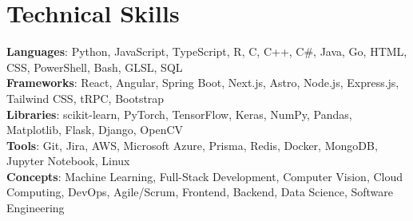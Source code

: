 \documentclass[letterpaper,11pt]{article}
\begin{document}
\section{Technical Skills}
 \begin{itemize}[leftmargin=0.15in, label={}]
    \small{\item{
     \textbf{Languages}{: Python, JavaScript, TypeScript, R, C, C++, C\#, Java, Go, HTML, CSS, PowerShell, Bash, GLSL, SQL} \\
     \textbf{Frameworks}{: React, Angular, Spring Boot, Next.js, Astro, Node.js, Express.js, Tailwind CSS, tRPC, Bootstrap} \\
     \textbf{Libraries}{: scikit-learn, PyTorch, TensorFlow, Keras, NumPy, Pandas, Matplotlib, Flask, Django, OpenCV} \\
     \textbf{Tools}{: Git, Jira, AWS, Microsoft Azure, Prisma, Redis, Docker, MongoDB, Jupyter Notebook, Linux} \\
    \textbf{Concepts}{: Machine Learning, Full-Stack Development, Computer Vision,
    Cloud Computing, DevOps, Agile/Scrum, Frontend, Backend, Data Science, Software Engineering} \\
    }}
 \end{itemize}

\end{document}
